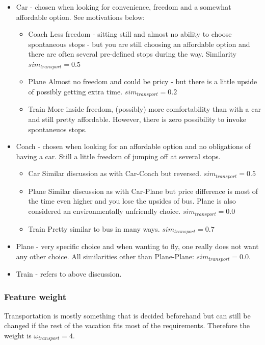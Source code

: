 \documentclass[12pt]{article}
\begin{document}
\begin{itemize}
\item Car - chosen when looking for convenience, freedom and a somewhat affordable option. See motivations below:
\begin{itemize}
\item Coach
\subitem Less freedom - sitting still and almost no ability to choose spontaneous stops - but you are still choosing an affordable option and there are often several pre-defined stops during the way. Similarity $sim_{transport}=0.5$
\item Plane
\subitem Almost no freedom and could be pricy - but there is a little upside of possibly getting extra time. $sim_{transport}=0.2$
\item Train
\subitem More inside freedom, (possibly) more comfortability than with a car and still pretty affordable. However, there is zero possibility to invoke spontaneuos stops.
\end{itemize}
\item Coach - chosen when looking for an affordable option and no obligations of having a car. Still a little freedom of jumping off at several stops. 
\begin{itemize}
\item Car
\subitem Similar discussion as with Car-Coach but reversed. $sim_{transport}=0.5$
\item Plane
\subitem Similar discussion as with Car-Plane but price difference is most of the time even higher and you lose the upsides of bus. Plane is also considered an environmentally unfriendly choice. $sim_{transport}=0.0$
\item Train
\subitem Pretty similar to bus in many ways. $sim_{transport}=0.7$
\end{itemize}
\item Plane - very specific choice and when wanting to fly, one really does not want any other choice. All similarities other than Plane-Plane: $sim_{transport}=0.0$.
\item Train - refers to above discussion. 
\end{itemize}

\subsubsection{Feature weight}
\label{sec:transport-weight}

Transportation is mostly something that is decided beforehand but can still be changed if the rest of the vacation fits most of the requirements. Therefore the weight is $\omega_{transport}=4$.
\end{document}
